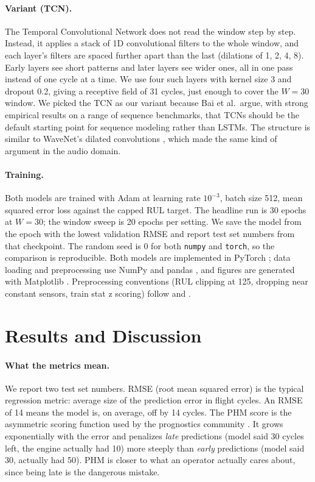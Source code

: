\documentclass{article}
\begin{document}
\paragraph{Variant (TCN).} The Temporal Convolutional Network \citep{bai2018tcn} does not read the window step by step. Instead, it applies a stack of 1D convolutional filters to the whole window, and each layer's filters are spaced further apart than the last (dilations of 1, 2, 4, 8). Early layers see short patterns and later layers see wider ones, all in one pass instead of one cycle at a time. We use four such layers with kernel size 3 and dropout 0.2, giving a receptive field of 31 cycles, just enough to cover the $W{=}30$ window. We picked the TCN as our variant because Bai et al.\ argue, with strong empirical results on a range of sequence benchmarks, that TCNs should be the default starting point for sequence modeling rather than LSTMs. The structure is similar to WaveNet's dilated convolutions \citep{oord2016wavenet}, which made the same kind of argument in the audio domain.

\paragraph{Training.} Both models are trained with Adam \citep{kingma2015adam} at learning rate $10^{-3}$, batch size 512, mean squared error loss against the capped RUL target. The headline run is 30 epochs at $W{=}30$; the window sweep is 20 epochs per setting. We save the model from the epoch with the lowest validation RMSE and report test set numbers from that checkpoint. The random seed is 0 for both \texttt{numpy} and \texttt{torch}, so the comparison is reproducible. Both models are implemented in PyTorch \citep{paszke2019pytorch}; data loading and preprocessing use NumPy \citep{harris2020numpy} and pandas \citep{mckinney2010pandas}, and figures are generated with Matplotlib \citep{hunter2007matplotlib}. Preprocessing conventions (RUL clipping at 125, dropping near constant sensors, train stat z scoring) follow \citet{zheng2017lstm} and \citet{li2018cmapss_cnn}.


\section{Results and Discussion}

\paragraph{What the metrics mean.} We report two test set numbers. RMSE (root mean squared error) is the typical regression metric: average size of the prediction error in flight cycles. An RMSE of 14 means the model is, on average, off by 14 cycles. The PHM score is the asymmetric scoring function used by the prognostics community \citep{saxena2008cmapss}. It grows exponentially with the error and penalizes \emph{late} predictions (model said 30 cycles left, the engine actually had 10) more steeply than \emph{early} predictions (model said 30, actually had 50). PHM is closer to what an operator actually cares about, since being late is the dangerous mistake.
\end{document}

